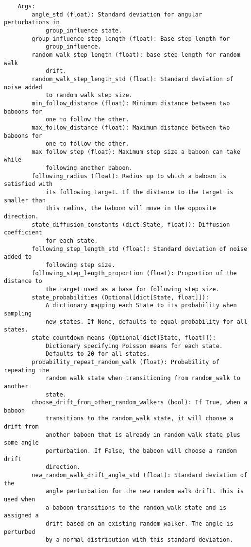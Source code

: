 \documentclass[
    article,
    oneside,
]{memoir}
\begin{document}
\begin{verbatim}
    Args:
        angle_std (float): Standard deviation for angular perturbations in
            group_influence state.
        group_influence_step_length (float): Base step length for
            group_influence.
        random_walk_step_length (float): base step length for random walk
            drift.
        random_walk_step_length_std (float): Standard deviation of noise added
            to random walk step size.
        min_follow_distance (float): Minimum distance between two baboons for
            one to follow the other.
        max_follow_distance (float): Maximum distance between two baboons for
            one to follow the other.
        max_follow_step (float): Maximum step size a baboon can take while
            following another baboon.
        following_radius (float): Radius up to which a baboon is satisfied with
            its following target. If the distance to the target is smaller than
            this radius, the baboon will move in the opposite direction.
        state_diffusion_constants (dict[State, float]): Diffusion coefficient
            for each state.
        following_step_length_std (float): Standard deviation of noise added to
            following step size.
        following_step_length_proportion (float): Proportion of the distance to
            the target used as a base for following step size.
        state_probabilities (Optional[dict[State, float]]):
            A dictionary mapping each State to its probability when sampling
            new states. If None, defaults to equal probability for all states.
        state_countdown_means (Optional[dict[State, float]]):
            Dictionary specifying Poisson means for each state.
            Defaults to 20 for all states.
        probability_repeat_random_walk (float): Probability of repeating the
            random walk state when transitioning from random_walk to another
            state.
        choose_drift_from_other_random_walkers (bool): If True, when a baboon
            transitions to the random_walk state, it will choose a drift from
            another baboon that is already in random_walk state plus some angle
            perturbation. If False, the baboon will choose a random drift
            direction.
        new_random_walk_drift_angle_std (float): Standard deviation of the
            angle perturbation for the new random walk drift. This is used when
            a baboon transitions to the random_walk state and is assigned a
            drift based on an existing random walker. The angle is perturbed
            by a normal distribution with this standard deviation.


\end{verbatim}
\end{document}
